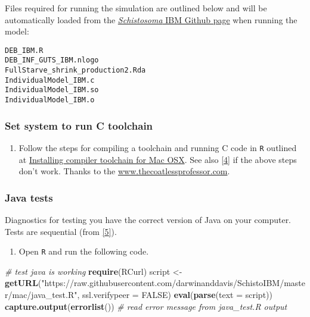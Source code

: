 \documentclass[10,portrait]{article}
\newenvironment{Shaded}{\begin{snugshade}}{\end{snugshade}}
\newcommand{\KeywordTok}[1]{\textcolor[rgb]{0.13,0.29,0.53}{\textbf{#1}}}
\newcommand{\DataTypeTok}[1]{\textcolor[rgb]{0.13,0.29,0.53}{#1}}
\newcommand{\StringTok}[1]{\textcolor[rgb]{0.31,0.60,0.02}{#1}}
\newcommand{\CommentTok}[1]{\textcolor[rgb]{0.56,0.35,0.01}{\textit{#1}}}
\newcommand{\OtherTok}[1]{\textcolor[rgb]{0.56,0.35,0.01}{#1}}
\newcommand{\NormalTok}[1]{#1}
\providecommand{\tightlist}{%
  \setlength{\itemsep}{0pt}\setlength{\parskip}{0pt}}
\begin{document}
Files required for running the simulation are outlined below and will be
automatically loaded from the
\href{https://github.com/darwinanddavis/SchistoIBM}{\emph{Schistosoma}
IBM Github page} when running the model:

\begin{verbatim}
DEB_IBM.R
DEB_INF_GUTS_IBM.nlogo
FullStarve_shrink_production2.Rda
IndividualModel_IBM.c
IndividualModel_IBM.so
IndividualModel_IBM.o
\end{verbatim}

\subsubsection{Set system to run C
toolchain}\label{set-system-to-run-c-toolchain}

\begin{enumerate}
\def\labelenumi{\arabic{enumi}.}
\tightlist
\item
  Follow the steps for compiling a toolchain and running C code in
  \texttt{R} outlined at
  \href{https://thecoatlessprofessor.com/programming/r-compiler-tools-for-rcpp-on-macos/}{Installing
  compiler toolchain for Mac OSX}. See also
  \protect\hyperlink{references}{{[}4{]}} if the above steps don't work.
  Thanks to the \url{www.thecoatlessprofessor.com}.
\end{enumerate}

\subsubsection{Java tests}\label{java-tests}

Diagnostics for testing you have the correct version of Java on your
computer. Tests are sequential (from
\protect\hyperlink{references}{{[}5{]}}).

\begin{enumerate}
\def\labelenumi{\arabic{enumi}.}
\tightlist
\item
  Open \texttt{R} and run the following code.
\end{enumerate}

\begin{Shaded}
\begin{Highlighting}[]
\CommentTok{# test java is working}
\KeywordTok{require}\NormalTok{(RCurl)}
\NormalTok{script <-}\StringTok{ }\KeywordTok{getURL}\NormalTok{(}\StringTok{"https://raw.githubusercontent.com/darwinanddavis/SchistoIBM/master/mac/java_test.R"}\NormalTok{, }\DataTypeTok{ssl.verifypeer =} \OtherTok{FALSE}\NormalTok{)}
\KeywordTok{eval}\NormalTok{(}\KeywordTok{parse}\NormalTok{(}\DataTypeTok{text =}\NormalTok{ script))}
\KeywordTok{capture.output}\NormalTok{(}\KeywordTok{errorlist}\NormalTok{()) }\CommentTok{# read error message from java_test.R output}
\end{Highlighting}
\end{Shaded}
\end{document}
